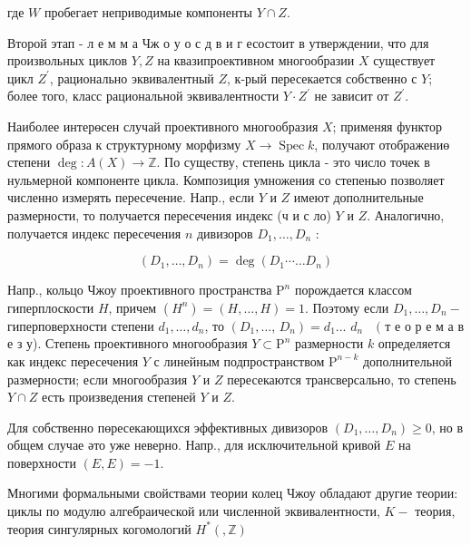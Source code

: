 \documentclass[10pt]{article}
\begin{document}
где $W$ пробегает неприводимые компоненты $Y \cap Z$.



Второй этап - л е м м а Чж о у о с д в и г есостоит в утверждении, что для произвольных циклов $Y, Z$ на квазипроективном многообразии $X$ существует цикл $Z^{\prime}$, рационально эквивалентный $Z$, к-рый пересекается собственно с $Y$; более того, класс рациональной эквивалентности $Y \cdot Z^{\prime}$ не зависит от $Z^{\prime}$.



Наиболее интерөсен случай проективного многообразия $X$; применяя функтор прямого образа к структурному морфизму $X \rightarrow \operatorname{Spec} k$, получают отображениө степени $\operatorname{deg}: A(X) \rightarrow \mathbb{Z}$. По существу, степень цикла - это число точек в нульмерной компоненте цикла. Композиция умножения со степенью позволяет численно измерять пересечение. Напр., если $Y$ и $Z$ имеют дополнительные размерности, то получается пересечения индекс (ч и с ло) $Y$ и $Z$. Аналогично, получается индекс пересечения $n$ дивизоров $D_{1}, \ldots, D_{n}$ :



\[

\left(D_{1}, \ldots, D_{n}\right)=\operatorname{deg}\left(D_{1} \cdots \ldots D_{n}\right)

\]



Напр., кольцо Чжоу проективного пространства $\mathrm{P}^{n}$ порождается классом гиперплоскости $H$, причем $\left(H^{n}\right)=(H, \ldots, H)=1$. Поэтому если $D_{1}, \ldots, D_{n}-$ гиперповерхности степени $d_{1}, \ldots, d_{n}$, то $\left(D_{1}, \ldots\right.$, $\left.D_{n}\right)=d_{1}$... $d_{n} \quad($ т е о р е м а в е з у). Степень проективного многообразия $Y \subset \mathrm{P}^{n}$ размерности $k$ определяется как индекс пересечения $Y$ с линейным подпространством $\mathrm{P}^{n-k}$ дополнительной размерности; если многообразия $Y$ и $Z$ пересекаются трансверсально, то степень $Y \cap Z$ есть произведения степеней $Y$ и $Z$.



Для собственно пөресекающихся эффективных дивизоров $\left(D_{1}, \ldots, D_{n}\right) \geqslant 0$, но в общем случае әто уже неверно. Напр., для исключительной кривой $E$ на поверхности $(E, E)=-1$.



Многими формальными свойствами теории колец Чжоу обладают другие теории: циклы по модулю алгебраической или численной эквивалентности, $K-$ теория, теория сингулярных когомологий $H^{*}(, \mathbb{Z})$
\end{document}
